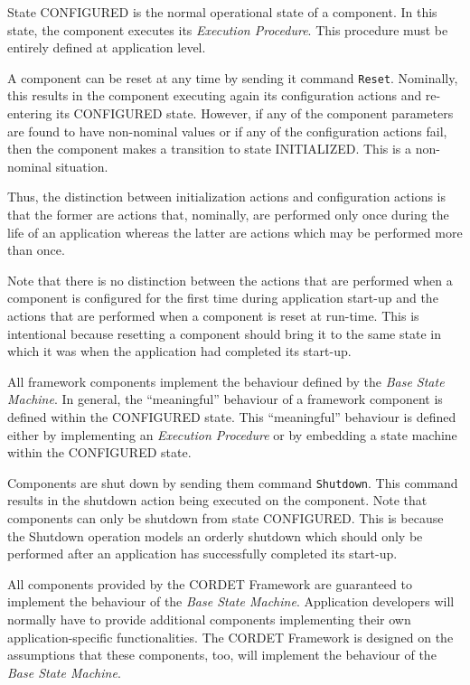 \documentclass[a4paper,10pt]{article}
\begin{document}
State CONFIGURED is the normal operational state of a component. 
In this state, the component executes its \textit{Execution Procedure}. 
This procedure must be entirely defined at application level. 

A component can be reset at any time by sending it command \texttt{Reset}. 
Nominally, this results in the component executing again its configuration actions and re-entering its CONFIGURED state. 
However, if any of the component parameters are found to have non-nominal values or if any of the configuration actions fail, then the component makes a transition to state INITIALIZED. 
This is a non-nominal situation.

Thus, the distinction between initialization actions and configuration actions is that the former are actions that, nominally, are performed only once during the life of an application whereas the latter are actions which may be performed more than once.

Note that there is no distinction between the actions that are performed when a component is configured for the first time during application start-up and the actions that are performed when a component is reset at run-time. 
This is intentional because resetting a component should bring it to the same state in which it was when the application had completed its start-up.

All framework components implement the behaviour defined by the \textit{Base State Machine}. In general, the “meaningful” behaviour of a framework component is defined within the CONFIGURED state. 
This “meaningful” behaviour is defined either by implementing an \textit{Execution Procedure} or by embedding a state machine within the CONFIGURED state.

Components are shut down by sending them command \texttt{Shutdown}. 
This command results in the shutdown action being executed on the component. 
Note that components can only be shutdown from state CONFIGURED.
This is because the Shutdown operation models an orderly shutdown which should only be performed after an application has successfully completed its start-up. 

All components provided by the CORDET Framework are guaranteed to implement the behaviour of the \textit{Base State Machine}. 
Application developers will normally have to provide additional components implementing their own application-specific functionalities.
The CORDET Framework is designed on the assumptions that these components, too, will implement the behaviour of the \textit{Base State Machine}.
\end{document}
